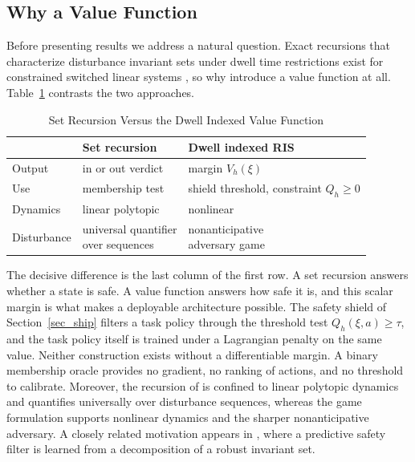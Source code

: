 \documentclass[journal]{IEEEtran}
\begin{document}
\subsection{Why a Value Function}\label{sec_whyvalue}

Before presenting results we address a natural question. Exact recursions that characterize disturbance invariant sets under dwell time restrictions exist for constrained switched linear systems \cite{dehghan2012}, so why introduce a value function at all. Table~\ref{tab_whyvalue} contrasts the two approaches.

\begin{table}[!t]
\renewcommand{\arraystretch}{1.35}
\caption{Set Recursion Versus the Dwell Indexed Value Function}
\label{tab_whyvalue}
\centering
\begin{tabular}{lll}
\toprule
 & Set recursion \cite{dehghan2012} & Dwell indexed RIS \\
\midrule
Output & in or out verdict & margin $V_h(\xi)$ \\
Use & membership test & \makecell[l]{shield threshold,\\constraint $Q_h \ge 0$} \\
Dynamics & linear polytopic & nonlinear \\
Disturbance & \makecell[l]{universal quantifier\\over sequences} & \makecell[l]{nonanticipative\\adversary game} \\
\bottomrule
\end{tabular}
\end{table}

The decisive difference is the last column of the first row. A set recursion answers whether a state is safe. A value function answers how safe it is, and this scalar margin is what makes a deployable architecture possible. The safety shield of Section~\ref{sec_ship} filters a task policy through the threshold test $Q_h(\xi, a) \ge \tau$, and the task policy itself is trained under a Lagrangian penalty on the same value. Neither construction exists without a differentiable margin. A binary membership oracle provides no gradient, no ranking of actions, and no threshold to calibrate. Moreover, the recursion of \cite{dehghan2012} is confined to linear polytopic dynamics and quantifies universally over disturbance sequences, whereas the game formulation supports nonlinear dynamics and the sharper nonanticipative adversary. A closely related motivation appears in \cite{li2311decomp}, where a predictive safety filter is learned from a decomposition of a robust invariant set.
\end{document}
